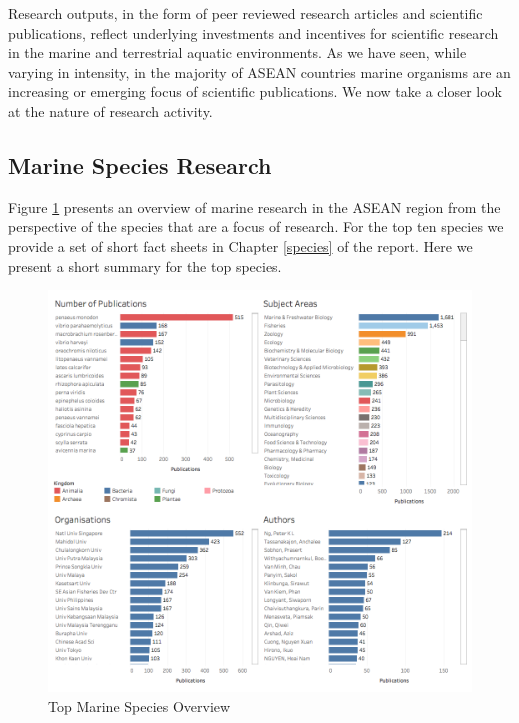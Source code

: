 \documentclass[]{book}
\theoremstyle{definition}
\theoremstyle{definition}
\theoremstyle{definition}
\theoremstyle{remark}
\begin{document}
Research outputs, in the form of peer reviewed research articles and
scientific publications, reflect underlying investments and incentives
for scientific research in the marine and terrestrial aquatic
environments. As we have seen, while varying in intensity, in the
majority of ASEAN countries marine organisms are an increasing or
emerging focus of scientific publications. We now take a closer look at
the nature of research activity.

\hypertarget{marine-species-research}{%
\subsection{Marine Species Research}\label{marine-species-research}}

Figure \ref{fig:taxonomysubjectarea} presents an overview of marine
research in the ASEAN region from the perspective of the species that
are a focus of research. For the top ten species we provide a set of
short fact sheets in Chapter \ref{species} of the report. Here we
present a short summary for the top species.

\begin{figure}

{\centering \includegraphics[width=1\linewidth]{images/aseanmarinlit_species_overview} 

}

\caption{Top Marine Species Overview}\label{fig:taxonomysubjectarea}
\end{figure}
\end{document}
